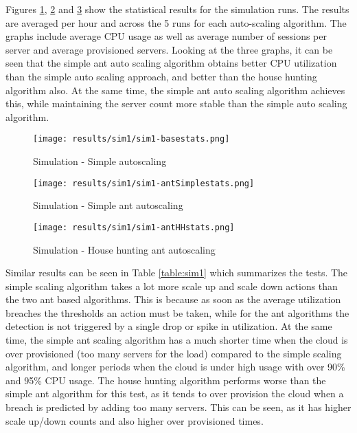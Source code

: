 Figures \ref{fig:sim1-basestats}, \ref{fig:sim1-antSimplestats} and \ref{fig:sim1-antHHstats} show the statistical results for the simulation runs. The results are averaged per hour and across the 5 runs for each auto-scaling algorithm. The graphs include average CPU usage as well as average number of sessions per server and average provisioned servers. Looking at the three graphs, it can be seen that the simple ant auto scaling algorithm obtains better CPU utilization than the simple auto scaling approach, and better than the house hunting algorithm also. At the same time, the simple ant auto scaling algorithm achieves this, while maintaining the server count more stable than the simple auto scaling algorithm.

\begin{figure}
	\centering
		\texttt{[image: results/sim1/sim1-basestats.png]}
	\caption{Simulation - Simple autoscaling}
	\label{fig:sim1-basestats}
\end{figure}

\begin{figure}
	\centering
		\texttt{[image: results/sim1/sim1-antSimplestats.png]}
	\caption{Simulation - Simple ant autoscaling}
	\label{fig:sim1-antSimplestats}
\end{figure}

\begin{figure}
	\centering
		\texttt{[image: results/sim1/sim1-antHHstats.png]}
	\caption{Simulation - House hunting ant autoscaling}
	\label{fig:sim1-antHHstats}
\end{figure}

Similar results can be seen in Table \ref{table:sim1} which summarizes the tests. The simple scaling algorithm takes a lot more scale up and scale down actions than the two ant based algorithms. This is because as soon as the average utilization breaches the thresholds an action must be taken, while for the ant algorithms the detection is not triggered by a single drop or spike in utilization. At the same time, the simple ant scaling algorithm has a much shorter time when the cloud is over provisioned (too many servers for the load) compared to the simple scaling algorithm, and longer periods when the cloud is under high usage with over 90\% and 95\% CPU usage. The house hunting algorithm performs worse than the simple ant algorithm for this test, as it tends to over provision the cloud when a breach is predicted by adding too many servers. This can be seen, as it has higher scale up/down counts and also higher over provisioned times.

